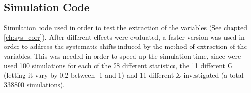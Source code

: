 \begin{figure}[htb]
\ContinuedFloat
  \begin{center} 
  \end{center}
\end{figure}

\FloatBarrier
\subsection{Simulation Code}
\label{app:simcode}
Simulation code used in order to test the extraction of the variables (See chapted \ref{ch:sys_corr}). After different effects were evaluated, a faster version was used in order to address the systematic shifts induced by the method of extraction of the variables. This was needed in order to speed up the simulation time, since were used 100 simulations for each of the 28 different statistics, the 11 different G (letting it vary by 0.2 between -1 and 1) and 11 different $\Sigma$ investigated (a total 338800 simulations).
